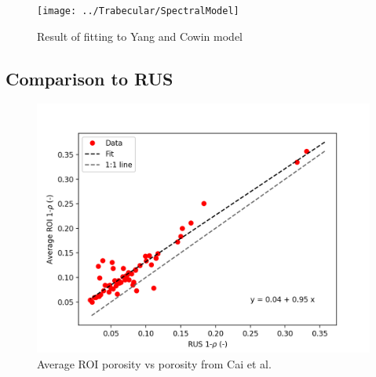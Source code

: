 \documentclass[a4paper,fleqn]{DC_ArtStyle}
\begin{document}
	\begin{figure}
		\centering
			\texttt{[image: ../Trabecular/SpectralModel]}
			\caption{Result of fitting to Yang and Cowin model}
	\end{figure}

	\clearpage
	\subsection{Comparison to RUS}

	\begin{figure}[!h]
		\centering
			\includegraphics[height=\linewidth]{../Results/ExpSim_Rho}
			\caption{Average ROI porosity vs porosity from Cai et al.}
	\end{figure}
\end{document}
